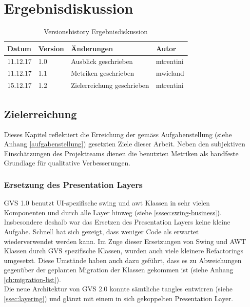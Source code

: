 \documentclass[11pt,a4paper,english,oneside]{book}
\numberwithin{equation}{chapter}
\begin{document}
	

	\chapter{Ergebnisdiskussion} \label{ch:ergebnisse}
	\begin{table}[h!]
		\centering
		\begin{tabularx}{\linewidth}{l l X l}
			\toprule 
			Datum & Version & Änderungen & Autor \\
			\midrule
			11.12.17 & 1.0 & Ausblick geschrieben & mtrentini \\
			11.12.17 & 1.1 & Metriken geschrieben & mwieland \\
			15.12.17 & 1.2 & Zielerreichung geschrieben & mtrentini \\
			\bottomrule 
		\end{tabularx} 
		\caption{Versionshistory Ergebnisdiskussion} 
	\end{table}	
	
	
	
	\section{Zielerreichung}
	Dieses Kapitel reflektiert die Erreichung der gemäss Aufgabenstellung (siehe Anhang \ref{aufgabenstellung}) gesetzten Ziele dieser Arbeit. Neben den subjektiven Einschätzungen des Projektteams dienen die benutzten Metriken als handfeste Grundlage für qualitative Verbesserungen.
	
	\subsection{Ersetzung des Presentation Layers}
	GVS 1.0 benutzt UI-spezifische \gls{swing} und \gls{awt} Klassen in sehr vielen Komponenten und durch alle Layer hinweg (siehe \ref{sssec:swing-business}). Insbesondere deshalb war das Ersetzen des Presentation Layers keine kleine Aufgabe. Schnell hat sich gezeigt, dass weniger Code als erwartet wiederverwendet werden kann. Im Zuge dieser Ersetzungen von Swing und AWT Klassen durch GVS spezifische Klassen, wurden auch viele kleinere Refactorings umgesetzt. Diese Umstände haben auch dazu geführt, dass es zu Abweichungen gegenüber der geplanten Migration der Klassen gekommen ist (siehe Anhang \ref{ch:migration-list}).\\
	Die neue Architektur von GVS 2.0 konnte sämtliche \glspl{tangle} entwirren (siehe \ref{ssec:layering}) und glänzt mit einem in sich gekoppelten Presentation Layer.
	
\end{document}
